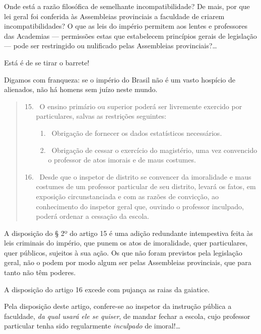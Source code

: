 Onde está a razão filosófica de semelhante incompatibilidade? De mais,
por que lei geral foi conferida às Assembleias provinciais a faculdade
de criarem incompatibilidades? O que as leis do império permitem aos
lentes e professores das Academias --- permissões estas que estabelecem
princípios gerais de legislação --- pode ser restringido ou nulificado
pelas Assembleias provinciais?\ldots

Está é de se tirar o barrete!

Digamos com franqueza: se o império do Brasil não é um vasto hospício de
alienados, não há homens sem juízo neste mundo.

\begin{quote}
\begin{enumerate}[label=Art.\,\arabic*:]
\setcounter{enumi}{14}
\item\ O ensino primário ou superior poderá ser livremente exercido
por particulares, salvas as restrições seguintes:

\begin{enumerate}[label=§\,\arabic*º:]
\item\ Obrigação de fornecer os dados estatísticos necessários.

\item\ Obrigação de cessar o exercício do magistério, uma vez convencido
o professor de atos imorais e de maus costumes.
\end{enumerate}

\item\ Desde que o inspetor de distrito se convencer da imoralidade e
maus costumes de um professor particular de seu distrito, levará os
fatos, em exposição circunstanciada e com as razões de convicção, ao
conhecimento do inspetor geral que, ouvindo o professor inculpado,
poderá ordenar a cessação da escola.
\end{enumerate}
\end{quote}

A disposição do § 2º do artigo 15 é uma adição redundante intempestiva
feita às leis criminais do império, que punem os atos de imoralidade,
quer particulares, quer públicos, sujeitos à sua ação. Os que não foram
previstos pela legislação geral, não o podem por modo algum ser pelas
Assembleias provinciais, que para tanto não têm poderes.

A disposição do artigo 16 excede com pujança as raias da gaiatice.

Pela disposição deste artigo, confere-se ao inspetor da instrução
pública a faculdade, \emph{da qual usará ele se quiser}, de mandar
fechar a escola, cujo professor particular tenha sido regularmente
\emph{inculpado} de imoral!\ldots{}

